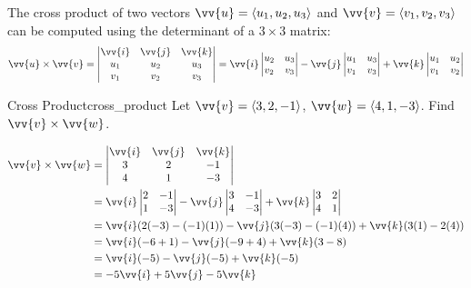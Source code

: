 The cross product of two vectors $\vv{u} = \ang{u_1, u_2, u_3}$ and $\vv{v} = \ang{v_1, v_2, v_3}$ can be computed using the determinant of a $3 \times 3$ matrix:
\[
\vv{u} \times \vv{v} = \begin{vmatrix}
\vv{i} & \vv{j} & \vv{k} \\
u_1 & u_2 & u_3 \\
v_1 & v_2 & v_3
\end{vmatrix}
= \vv{i} \begin{vmatrix} u_2 & u_3 \\ v_2 & v_3 \end{vmatrix}
- \vv{j} \begin{vmatrix} u_1 & u_3 \\ v_1 & v_3 \end{vmatrix}
+ \vv{k} \begin{vmatrix} u_1 & u_2 \\ v_1 & v_2 \end{vmatrix}
\]

\begin{problem}{Cross Product}{cross_product}
Let $\vv{v} = \ang{3, 2, -1}$, $\vv{w} = \ang{4, 1, -3}$. Find $\vv{v} \times \vv{w}$.
\end{problem}

\begin{sol}
\begin{align*}
\vv{v} \times \vv{w} &= \begin{vmatrix}
\vv{i} & \vv{j} & \vv{k} \\
3 & 2 & -1 \\
4 & 1 & -3
\end{vmatrix} \\
&= \vv{i} \begin{vmatrix} 2 & -1 \\ 1 & -3 \end{vmatrix}
- \vv{j} \begin{vmatrix} 3 & -1 \\ 4 & -3 \end{vmatrix}
+ \vv{k} \begin{vmatrix} 3 & 2 \\ 4 & 1 \end{vmatrix} \\
&= \vv{i}(2(-3) - (-1)(1)) - \vv{j}(3(-3) - (-1)(4)) + \vv{k}(3(1) - 2(4)) \\
&= \vv{i}(-6 + 1) - \vv{j}(-9 + 4) + \vv{k}(3 - 8) \\
&= \vv{i}(-5) - \vv{j}(-5) + \vv{k}(-5) \\
&= -5\vv{i} + 5\vv{j} - 5\vv{k}
\end{align*}
\end{sol}

